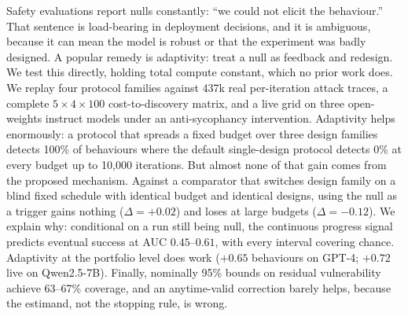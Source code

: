 Safety evaluations report nulls constantly: ``we could not elicit the behaviour.'' That
sentence is load-bearing in deployment decisions, and it is ambiguous, because it can mean the
model is robust or that the experiment was badly designed. A popular remedy is adaptivity: treat
a null as feedback and redesign. We test this directly, holding total compute constant, which no
prior work does. We replay four protocol families against 437k real per-iteration attack traces,
a complete $5\times4\times100$ cost-to-discovery matrix, and a live grid on three open-weights
instruct models under an anti-sycophancy intervention. Adaptivity helps enormously: a protocol
that spreads a fixed budget over three design families detects 100\% of behaviours where the
default single-design protocol detects 0\% at every budget up to 10{,}000 iterations. But almost
none of that gain comes from the proposed mechanism. Against a comparator that switches design
family on a blind fixed schedule with identical budget and identical designs, using the null as
a trigger gains nothing ($\Delta = +0.02$) and loses at large budgets ($\Delta = -0.12$). We
explain why: conditional on a run still being null, the continuous progress signal predicts
eventual success at AUC $0.45$--$0.61$, with every interval covering chance. Adaptivity at the
portfolio level does work ($+0.65$ behaviours on GPT-4; $+0.72$ live on Qwen2.5-7B). Finally,
nominally 95\% bounds on residual vulnerability achieve 63--67\% coverage, and an anytime-valid
correction barely helps, because the estimand, not the stopping rule, is wrong.
